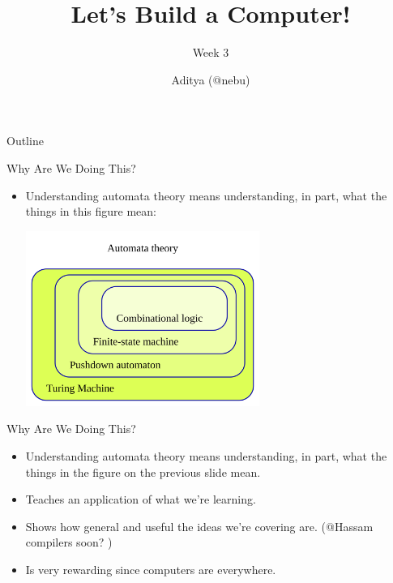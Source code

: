 \documentclass[aspectratio=169, 11pt, handout]{beamer}
\title{Let's Build a Computer!}
\subtitle{Week 3}
\author{Aditya ({\color{sigma@mainblue}\textsf{@nebu}})}
\date{}
\begin{document}

\begin{frame}
\titlepage
\end{frame}

\begin{frame}{Outline}
  \tableofcontents
\end{frame}

\begin{frame}{Why Are We Doing This?}
  \pause
  \begin{itemize}
    \item Understanding automata theory means understanding, in part,
        what the things in this figure mean:
        \begin{center}
        \includegraphics[width=0.6\textwidth]{2560px-Automata_theory.png}
        \end{center}
  \end{itemize}
\end{frame}

\begin{frame}{Why Are We Doing This?}

  \begin{itemize}
    \item Understanding automata theory means understanding, in part,
        what the things in the figure on the previous slide mean. 
        \item Teaches an application of what we're learning.\pause
        \item Shows how general and useful the ideas we're covering are. ({\color{sigma@mainblue}\textsf{@Hassam}} compilers soon? )\pause
        \item Is very rewarding since computers are everywhere.
  \end{itemize}
\end{frame}
\end{document}
